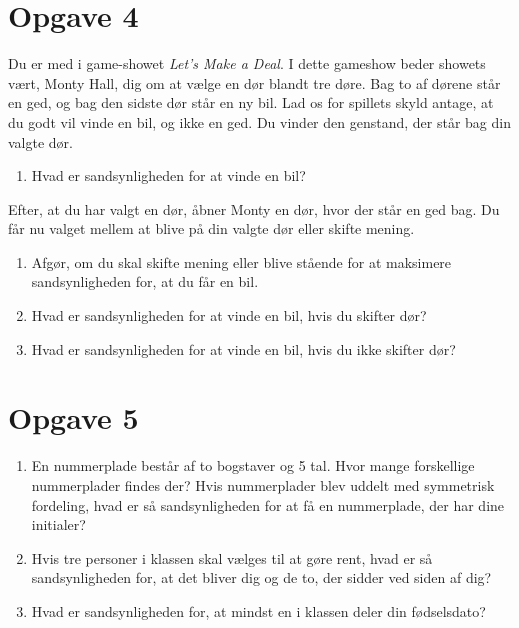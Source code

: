 \section*{Opgave 4}
Du er med i game-showet \textit{Let's Make a Deal}. I dette gameshow beder showets vært, Monty Hall, dig om at vælge en dør blandt tre døre. Bag to af dørene står en ged, og bag den sidste dør står en ny bil. Lad os for spillets skyld antage, at du godt vil vinde en bil, og ikke en ged. Du vinder den genstand, der står bag din valgte dør. 
\begin{enumerate}[label=\roman*)]
\item Hvad er sandsynligheden for at vinde en bil?
\end{enumerate}
Efter, at du har valgt en dør, åbner Monty en dør, hvor der står en ged bag. Du får nu valget mellem at blive på din valgte dør eller skifte mening.
\begin{enumerate}[label=\roman*)]
\item Afgør, om du skal skifte mening eller blive stående for at maksimere sandsynligheden for, at du får en bil.
\item Hvad er sandsynligheden for at vinde en bil, hvis du skifter dør?
\item Hvad er sandsynligheden for at vinde en bil, hvis du ikke skifter dør?
\end{enumerate}

\section*{Opgave 5}
\begin{enumerate}[label=\roman*)]
\item En nummerplade består af to bogstaver og 5 tal. Hvor mange forskellige nummerplader findes der? Hvis nummerplader blev uddelt med symmetrisk fordeling, hvad er så sandsynligheden for at få en nummerplade, der har dine initialer?
\item Hvis tre personer i klassen skal vælges til at gøre rent, hvad er så sandsynligheden for, at det bliver dig og de to, der sidder ved siden af dig?
\item Hvad er sandsynligheden for, at mindst en i klassen deler din fødselsdato?
\end{enumerate}
